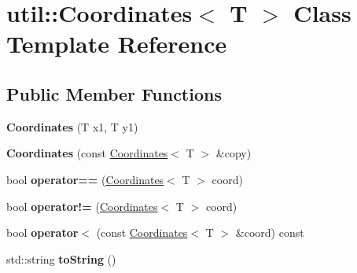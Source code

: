 \hypertarget{classutil_1_1_coordinates}{\section{util\-:\-:Coordinates$<$ T $>$ Class Template Reference}
\label{classutil_1_1_coordinates}
}
\subsection*{Public Member Functions}
\begin{DoxyCompactItemize}
\item 
\hypertarget{classutil_1_1_coordinates_af6bb68b026499ee0e605a12a0d18771f}{{\bfseries Coordinates} (T x1, T y1)}\label{classutil_1_1_coordinates_af6bb68b026499ee0e605a12a0d18771f}

\item 
\hypertarget{classutil_1_1_coordinates_a914fe262daf07aaee5c3269307ab3427}{{\bfseries Coordinates} (const \hyperlink{classutil_1_1_coordinates}{Coordinates}$<$ T $>$ \&copy)}\label{classutil_1_1_coordinates_a914fe262daf07aaee5c3269307ab3427}

\item 
\hypertarget{classutil_1_1_coordinates_af5928fdec60da71f853abd20470d8592}{bool {\bfseries operator==} (\hyperlink{classutil_1_1_coordinates}{Coordinates}$<$ T $>$ coord)}\label{classutil_1_1_coordinates_af5928fdec60da71f853abd20470d8592}

\item 
\hypertarget{classutil_1_1_coordinates_a99556ad5c225c693ff204182794f57cc}{bool {\bfseries operator!=} (\hyperlink{classutil_1_1_coordinates}{Coordinates}$<$ T $>$ coord)}\label{classutil_1_1_coordinates_a99556ad5c225c693ff204182794f57cc}

\item 
\hypertarget{classutil_1_1_coordinates_a127e80ca9ea00165706062ee0ffc846d}{bool {\bfseries operator$<$} (const \hyperlink{classutil_1_1_coordinates}{Coordinates}$<$ T $>$ \&coord) const }\label{classutil_1_1_coordinates_a127e80ca9ea00165706062ee0ffc846d}

\item 
\hypertarget{classutil_1_1_coordinates_ada8a3e6afdaad992bb9b431411ed5950}{std\-::string {\bfseries to\-String} ()}\label{classutil_1_1_coordinates_ada8a3e6afdaad992bb9b431411ed5950}

\end{DoxyCompactItemize}
